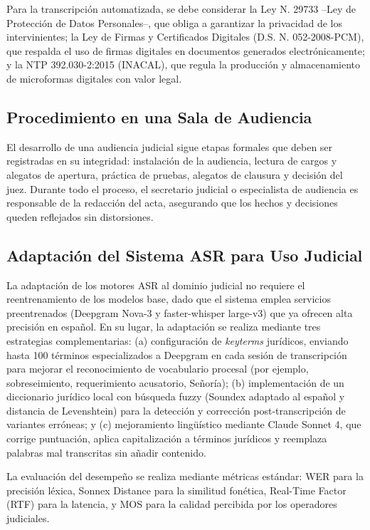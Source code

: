 \documentclass[12pt,a4paper,oneside]{report}
\begin{document}
Para la transcripción automatizada, se debe considerar la Ley N.\textordmasculine{} 29733 --Ley de Protección de Datos Personales--, que obliga a garantizar la privacidad de los intervinientes; la Ley de Firmas y Certificados Digitales (D.S. N.\textordmasculine{} 052-2008-PCM), que respalda el uso de firmas digitales en documentos generados electrónicamente; y la NTP 392.030-2:2015 (INACAL), que regula la producción y almacenamiento de microformas digitales con valor legal.

\subsection{Procedimiento en una Sala de Audiencia}

El desarrollo de una audiencia judicial sigue etapas formales que deben ser registradas en su integridad: instalación de la audiencia, lectura de cargos y alegatos de apertura, práctica de pruebas, alegatos de clausura y decisión del juez. Durante todo el proceso, el secretario judicial o especialista de audiencia es responsable de la redacción del acta, asegurando que los hechos y decisiones queden reflejados sin distorsiones.

\subsection{Adaptación del Sistema ASR para Uso Judicial}

La adaptación de los motores ASR al dominio judicial no requiere el reentrenamiento de los modelos base, dado que el sistema emplea servicios preentrenados (Deepgram Nova-3 y faster-whisper large-v3) que ya ofrecen alta precisión en español. En su lugar, la adaptación se realiza mediante tres estrategias complementarias: (a) configuración de \textit{keyterms} jurídicos, enviando hasta 100 términos especializados a Deepgram en cada sesión de transcripción para mejorar el reconocimiento de vocabulario procesal (por ejemplo, sobreseimiento, requerimiento acusatorio, Señoría); (b) implementación de un diccionario jurídico local con búsqueda fuzzy (Soundex adaptado al español y distancia de Levenshtein) para la detección y corrección post-transcripción de variantes erróneas; y (c) mejoramiento lingüístico mediante Claude Sonnet 4, que corrige puntuación, aplica capitalización a términos jurídicos y reemplaza palabras mal transcritas sin añadir contenido.

La evaluación del desempeño se realiza mediante métricas estándar: WER para la precisión léxica, Sonnex Distance para la similitud fonética, Real-Time Factor (RTF) para la latencia, y MOS para la calidad percibida por los operadores judiciales.
\end{document}
